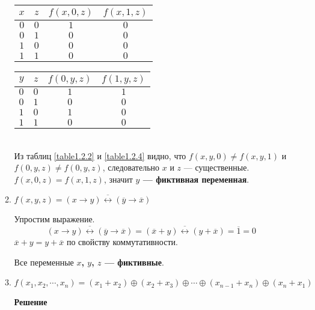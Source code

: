 \documentclass[12pt]{article}
\begin{document}
\begin{enumerate}[label={\textbf{\arabic{section}.\arabic*}}]
\begin{enumerate}[label=\textbf{\alph*)}]
			\begin{minipage}{0.5\linewidth}
				\centering
				\begin{tabular}{|c|c|c|c|} \hline
					$x$ & $z$ & $f(x, 0, z)$ & $f(x, 1, z)$ \\ \hline
					$0$ & $0$ & $1$ & $0$ \\
					$0$ & $1$ & $0$ & $0$ \\
					$1$ & $0$ & $0$ & $0$ \\
					$1$ & $1$ & $0$ & $0$ \\ \hline
				\end{tabular}
				\label{table1.2.3}
			\end{minipage}
			\hfill
			\begin{minipage}{0.49\linewidth}
				\centering
				\begin{tabular}{|c|c|c|c|} \hline
					$y$ & $z$ & $f(0, y, z)$ & $f(1, y, z)$ \\ \hline
					$0$ & $0$ & $1$ & $1$ \\
					$0$ & $1$ & $0$ & $0$ \\
					$1$ & $0$ & $1$ & $0$ \\
					$1$ & $1$ & $0$ & $0$ \\ \hline
				\end{tabular}
				\label{table1.2.4}
			\end{minipage}\\
			
			Из таблиц \ref{table1.2.2} и \ref{table1.2.4} видно, что $f(x, y, 0) \neq f(x, y, 1)$ и $f(0, y, z) \neq f(0, y, z)$, следовательно $x$ и $z$ --- существенные. $f(x, 0, z) = f(x, 1, z)$, значит \textbf{$y$ --- фиктивная переменная}.
			\item $f(x,y,z) = \overline{(x\rightarrow y)\leftrightarrow(\overline{y}\rightarrow\overline{x})}$
			
			Упростим выражение.
			$$
			\overline{(x\rightarrow y)\leftrightarrow(\overline{y}\rightarrow\overline{x})} = \overline{(\overline{x} + y) \leftrightarrow (y + \overline{x})} = \overline{1} = 0
			$$
			$\overline{x} + y = y + \overline{x}$ по свойству коммутативности.
			
			Все переменные \textbf{$x$, $y$, $z$ --- фиктивные}.
			\item  $f(x_1,x_2,\cdots,x_n)=(x_1+x_2)\oplus(x_2+x_3)\oplus\cdots\oplus(x_{n-1}+x_n)\oplus(x_n+x_1)$
			
			\textbf{Решение}
			

\end{enumerate}
\end{enumerate}
\end{document}
